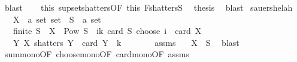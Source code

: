 \begin{isabellebody}
\ blast\isanewline
\ \ \isamarkupfalse%
\ this{\isacharparenleft}{\kern0pt}{}{\isacharparenright}{\kern0pt}\ supset{\isacharunderscore}{\kern0pt}shatters{\isacharbrackleft}{\kern0pt}OF\ this{\isacharparenleft}{\kern0pt}{}{\isacharparenright}{\kern0pt}\ F{\isacharunderscore}{\kern0pt}shatters{\isacharunderscore}{\kern0pt}S{\isacharbrackright}{\kern0pt}\ \isamarkupfalse%
\ {\isacharquery}{\kern0pt}thesis\ \isamarkupfalse%
\ blast\isanewline
{}\isamarkupfalse%
%
\endisatagproof
{\isafoldproof}%
%
\isadelimproof
%
\endisadelimproof
%
\isadelimdocument
%
\endisadelimdocument
%
\isatagdocument
%
\isamarkuptrue%
%
\endisatagdocument
{\isafolddocument}%
%
\isadelimdocument
%
\endisadelimdocument
{}\isamarkupfalse%
\ sauer{\isacharunderscore}{\kern0pt}shelah{\isacharunderscore}{\kern0pt}{}{\isacharcolon}{\kern0pt}\isanewline
\ \ \ X\ {\isacharcolon}{\kern0pt}{\isacharcolon}{\kern0pt}\ {\isachardoublequoteopen}{\isacharprime}{\kern0pt}a\ set\ set{\isachardoublequoteclose}\ \ S\ {\isacharcolon}{\kern0pt}{\isacharcolon}{\kern0pt}\ {\isachardoublequoteopen}{\isacharprime}{\kern0pt}a\ set{\isachardoublequoteclose}\isanewline
\ \ \ {\isachardoublequoteopen}finite\ S{\isachardoublequoteclose}\ \ {\isachardoublequoteopen}X\ {\isasymsubseteq}\ Pow\ S{\isachardoublequoteclose}\ \ {\isachardoublequoteopen}{\isacharparenleft}{\kern0pt}{\isasymSum}i{\isasymle}k{\isachardot}{\kern0pt}\ card\ S\ choose\ i{\isacharparenright}{\kern0pt}\ {\isacharless}{\kern0pt}\ card\ X{\isachardoublequoteclose}\isanewline
\ \ \ {\isachardoublequoteopen}{\isasymexists}Y{\isachardot}{\kern0pt}\ {\isacharparenleft}{\kern0pt}X\ shatters\ Y\ {\isasymand}\ card\ Y\ {\isacharequal}{\kern0pt}\ k\ {\isacharplus}{\kern0pt}\ {}{\isacharparenright}{\kern0pt}{\isachardoublequoteclose}\isanewline
%
\isadelimproof
%
\endisadelimproof
%
\isatagproof
{}\isamarkupfalse%
\ {\isacharminus}{\kern0pt}\isanewline
\ \ \isamarkupfalse%
\ assms{\isacharparenleft}{\kern0pt}{}{\isacharparenright}{\kern0pt}\ \isamarkupfalse%
\ {}{\isacharcolon}{\kern0pt}\ {\isachardoublequoteopen}{\isasymUnion}X\ {\isasymsubseteq}\ S{\isachardoublequoteclose}\ \isamarkupfalse%
\ blast\isanewline
\ \ \isamarkupfalse%
\ sum{\isacharunderscore}{\kern0pt}mono{\isacharbrackleft}{\kern0pt}OF\ choose{\isacharunderscore}{\kern0pt}mono{\isacharbrackleft}{\kern0pt}OF\ card{\isacharunderscore}{\kern0pt}mono{\isacharbrackleft}{\kern0pt}OF\ assms{\isacharparenleft}{\kern0pt}{}{\isacharparenright}{\kern0pt}\ {}{\isacharbrackright}{\kern0pt}{\isacharbrackright}{\kern0pt}{\isacharbrackright}{\kern0pt}\ \isamarkupfalse%

\end{isabellebody}
